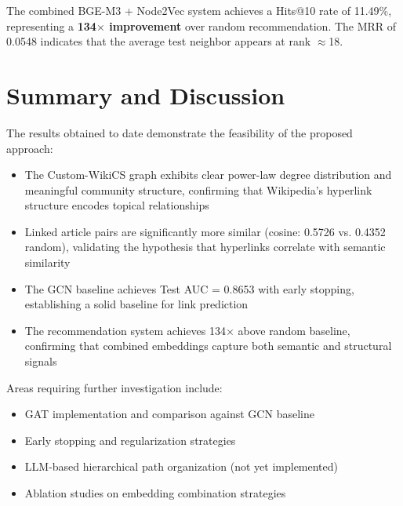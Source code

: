 The combined BGE-M3 + Node2Vec system achieves a Hits@10 rate of 11.49\%, representing a \textbf{134$\times$ improvement} over random recommendation. The MRR of 0.0548 indicates that the average test neighbor appears at rank $\approx$18.

\section{Summary and Discussion}

The results obtained to date demonstrate the feasibility of the proposed approach:

\begin{itemize}
    \item The Custom-WikiCS graph exhibits clear power-law degree distribution and meaningful community structure, confirming that Wikipedia's hyperlink structure encodes topical relationships
    \item Linked article pairs are significantly more similar (cosine: 0.5726 vs. 0.4352 random), validating the hypothesis that hyperlinks correlate with semantic similarity
    \item The GCN baseline achieves Test AUC = 0.8653 with early stopping, establishing a solid baseline for link prediction
    \item The recommendation system achieves 134$\times$ above random baseline, confirming that combined embeddings capture both semantic and structural signals
\end{itemize}

Areas requiring further investigation include:
\begin{itemize}
    \item GAT implementation and comparison against GCN baseline
    \item Early stopping and regularization strategies
    \item LLM-based hierarchical path organization (not yet implemented)
    \item Ablation studies on embedding combination strategies
\end{itemize}
